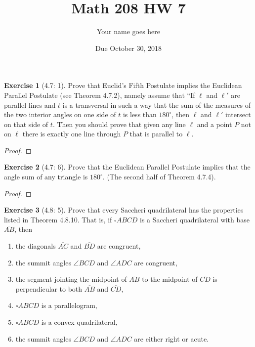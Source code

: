 \documentclass[11pt]{article}		%
\title{Math 208 HW 7}
\author{Your name goes here}
\date{Due October 30, 2018}
\newcommand{\seg}[1]{\overline{#1}}
\theoremstyle{definition}
\newtheorem*{exercise*}{Exercise}
\begin{document}
	\maketitle
	
	
	\begin{exercise*}[4.7: 1]
		Prove that Euclid's Fifth Postulate implies the Euclidean Parallel Postulate (see Theorem 4.7.2), namely assume that  ``If $\ell$ and $\ell'
		$ are parallel lines and $t$ is a transversal in such a way that the sum of the measures of the two interior angles on one side of $t$ is less than $180^\circ$, then $\ell$ and $\ell'$ intersect on that side of $t$.  Then you should prove that given any line $\ell$ and a point $P$ not on $\ell$ there is exactly one line through $P$ that is parallel to $\ell$.
	\end{exercise*}
	
	\begin{proof} 
			
	\end{proof}
	

\vspace{1in}

	
	\begin{exercise*}[4.7: 6]
	Prove that the Euclidean Parallel Postulate implies that the angle sum of any triangle is $180^\circ$.  (The second half of Theorem 4.7.4).
\end{exercise*}
	
	\begin{proof} 
		
	\end{proof}


\vspace{1in}


\begin{exercise*}[4.8: 5]
	Prove that every Saccheri quadrilateral has the properties listed in Theorem 4.8.10.  That is, if $\square ABCD$ is a Saccheri quadrilateral with base $\seg{AB}$, then
	\begin{enumerate}
		\item the diagonals $\seg{AC}$ and $\seg{BD}$ are congruent,
		\item the summit angles $\angle BCD$ and $\angle ADC$ are congruent,
		\item the segment jointing the midpoint of $\seg{AB}$ to the midpoint of $\seg{CD}$ is perpendicular to both $\seg{AB}$ and $\seg{CD}$,
		\item $\square ABCD$ is a parallelogram,
		\item $\square ABCD$ is a convex quadrilateral,
		\item the summit angles $\angle BCD$ and $\angle ADC$ are either right or acute.
	\end{enumerate}
\end{exercise*}
\end{document}
